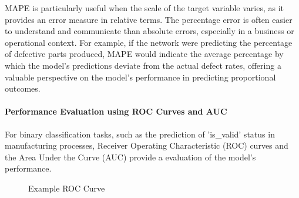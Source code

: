 MAPE is particularly useful when the scale of the target variable varies, as it provides an error measure in relative terms. The percentage error is often easier to understand and communicate than absolute errors, especially in a business or operational context. For example, if the network were predicting the percentage of defective parts produced, MAPE would indicate the average percentage by which the model's predictions deviate from the actual defect rates, offering a valuable perspective on the model's performance in predicting proportional outcomes.

\paragraph{\textbf{Performance Evaluation using ROC Curves and AUC}}
For binary classification tasks, such as the prediction of 'is\_valid' status in manufacturing processes, Receiver Operating Characteristic (ROC) curves and the Area Under the Curve (AUC) provide a evaluation of the model's performance.

\begin{figure}[h]
  \centering
  \caption{Example ROC Curve}
  \label{fig:roc}
\end{figure}

